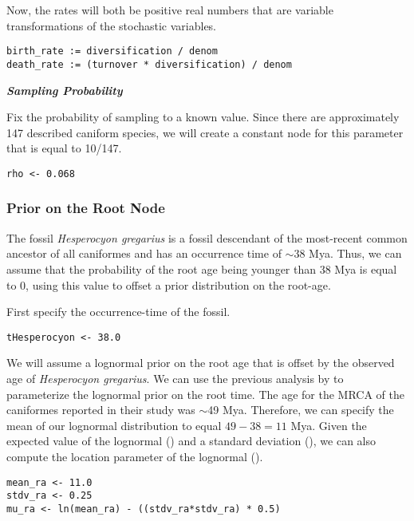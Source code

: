 Now, the rates will both be positive real numbers that are variable transformations of the stochastic variables.
{\tt \begin{snugshade*}
\begin{lstlisting}
birth_rate := diversification / denom
death_rate := (turnover * diversification) / denom
\end{lstlisting}
\end{snugshade*}}

\textbf{\textit{Sampling Probability}}

Fix the probability of sampling to a known value. Since there are approximately 147 described caniform species, we will create a constant node for this parameter that is equal to 10/147.
{\tt \begin{snugshade*}
\begin{lstlisting}
rho <- 0.068
\end{lstlisting}
\end{snugshade*}}

\subsubsection{Prior on the Root Node}

The fossil \textit{Hesperocyon gregarius} is a fossil descendant of the most-recent common ancestor of all caniformes and has an occurrence time of $\sim$38 Mya.
Thus, we can assume that the probability of the root age being younger than 38 Mya is equal to 0, using this value to offset a prior distribution on the root-age.

First specify the occurrence-time of the fossil.
{\tt \begin{snugshade*}
\begin{lstlisting}
tHesperocyon <- 38.0
\end{lstlisting}
\end{snugshade*}}

We will assume a lognormal prior on the root age that is offset by the observed age of \textit{Hesperocyon gregarius}. 
We can use the previous analysis by \citet{dosReis2012} to parameterize the lognormal prior on the root time. 
The age for the MRCA of the caniformes reported in their study was $\sim$49 Mya. 
Therefore, we can specify the mean of our lognormal distribution to equal $49 - 38 = 11$ Mya.
Given the expected value of the lognormal () and a standard deviation (), we can also compute the location parameter of the lognormal ().
{\tt \begin{snugshade*}
\begin{lstlisting}
mean_ra <- 11.0
stdv_ra <- 0.25
mu_ra <- ln(mean_ra) - ((stdv_ra*stdv_ra) * 0.5)
\end{lstlisting}
\end{snugshade*}}

